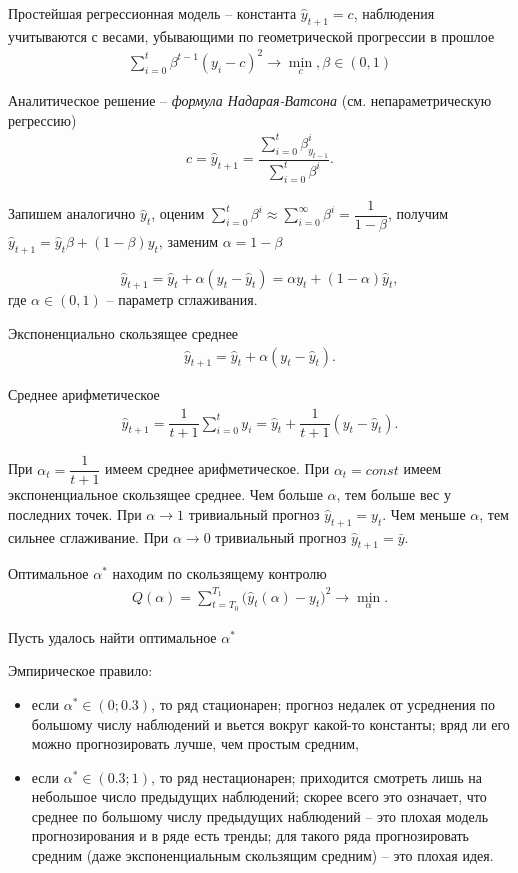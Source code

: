 \documentclass[%
	11pt,
	a4paper,
	utf8,
		]{article}
\begin{document}
Простейшая регрессионная модель -- константа $ \hat{y}_{t + 1} = c $, наблюдения учитываются с весами, убывающими по геометрической прогрессии в прошлое
\begin{align*}
	\sum_{i = 0}^{t} \beta^{t - 1}(y_i - c)^2 \to \min_c, \beta \in (0, 1)
\end{align*}

Аналитическое решение -- \emph{формула Надарая-Ватсона} (см. непараметрическую регрессию)
\begin{align*}
	c = \hat{y}_{t + 1} = \dfrac{ \sum\limits_{i=0}^{t} \beta^i_{y_{t-1}} }{ \sum\limits_{i=0}^{t} \beta^i }.
\end{align*}

Запишем аналогично $ \hat{y}_t $, оценим $ \sum\limits_{i = 0}^{t} \beta^i \approx \sum\limits_{i=0}^{\infty} \beta^i = \dfrac{1}{1 - \beta}$, получим $ \hat{y}_{t + 1} = \hat{y}_t \beta + (1 - \beta) y_t $, заменим $ \alpha = 1 - \beta $

$$ \hat{y}_{t + 1} = \hat{y}_t + \alpha (y_t - \hat{y}_t) = \alpha y_t + (1 - \alpha) \hat{y}_t, $$
где $ \alpha \in (0, 1) $ -- параметр сглаживания. 

Экспоненциально скользящее среднее
\begin{align*}
	\hat{y}_{t + 1} = \hat{y}_t + \alpha (y_t - \hat{y}_t).
\end{align*}

Среднее арифметическое 
\begin{align*}
	\hat{y}_{t + 1} = \dfrac{1}{t + 1} \sum_{i=0}^{t} y_i = \hat{y}_t + \dfrac{1}{t + 1} (y_t - \hat{y}_t).
\end{align*}

При $ \alpha_t = \dfrac{1}{t + 1} $ имеем среднее арифметическое. При $ \alpha_t = const $ имеем экспоненциальное скользящее среднее. Чем больше $ \alpha $, тем больше вес у последних точек. При $ \alpha \to 1 $ тривиальный прогноз $ \hat{y}_{t + 1} = y_t $. Чем меньше $ \alpha $, тем сильнее сглаживание. При $ \alpha \to 0 $ тривиальный прогноз $ \hat{y}_{t + 1} = \bar{y} $.

Оптимальное $ \alpha^* $ находим по скользящему контролю
\begin{align*}
	Q(\alpha) = \sum_{t = T_0}^{T_1} \big( \hat{y}_t(\alpha) - y_t \big)^2 \to \min_{\alpha}.
\end{align*}

Пусть удалось найти оптимальное $ \alpha^* $

Эмпирическое правило:
\begin{itemize}
	\item если $ \alpha^* \in (0; 0.3)$, то ряд стационарен; прогноз недалек от усреднения по большому числу наблюдений и вьется вокруг какой-то константы; вряд ли его можно прогнозировать лучше, чем простым средним,
	
	\item если $ \alpha^* \in (0.3; 1) $, то ряд нестационарен; приходится смотреть лишь на небольшое число предыдущих наблюдений; скорее всего это означает, что среднее по большому числу предыдущих наблюдений -- это плохая модель прогнозирования и в ряде есть тренды; для такого ряда прогнозировать средним (даже экспоненциальным скользящим средним) -- это плохая идея.
\end{itemize}
\end{document}
